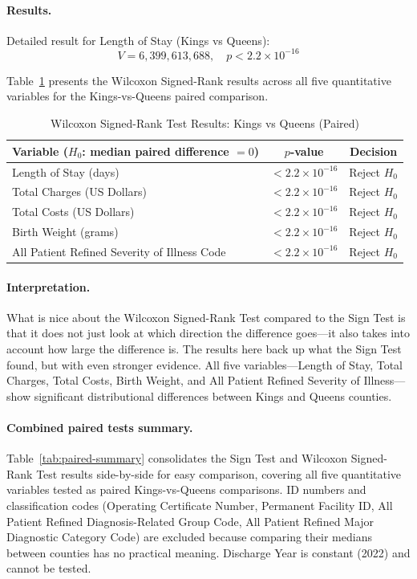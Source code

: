 \documentclass[12pt]{article}
\begin{document}
\paragraph{Results.}

Detailed result for Length of Stay (Kings vs Queens):
\[
V = 6{,}399{,}613{,}688, \quad p < 2.2 \times 10^{-16}
\]

Table~\ref{tab:wsr-all} presents the Wilcoxon Signed-Rank results
across all five quantitative variables for the Kings-vs-Queens paired
comparison.

\begin{table}[H]
\centering
\caption{Wilcoxon Signed-Rank Test Results: Kings vs Queens (Paired)}
\label{tab:wsr-all}
\begin{tabular}{lcc}
\toprule
\textbf{Variable ($H_0$: median paired difference $= 0$)} & \textbf{$p$-value} & \textbf{Decision} \\
\midrule
Length of Stay (days)           & $< 2.2 \times 10^{-16}$ & Reject $H_0$ \\
Total Charges (US Dollars)             & $< 2.2 \times 10^{-16}$ & Reject $H_0$ \\
Total Costs (US Dollars)               & $< 2.2 \times 10^{-16}$ & Reject $H_0$ \\
Birth Weight (grams)            & $< 2.2 \times 10^{-16}$ & Reject $H_0$ \\
All Patient Refined Severity of Illness Code    & $< 2.2 \times 10^{-16}$ & Reject $H_0$ \\
\bottomrule
\end{tabular}
\end{table}

\paragraph{Interpretation.}
What is nice about the Wilcoxon Signed-Rank Test compared to the Sign
Test is that it does not just look at which direction the difference
goes---it also takes into account how large the difference is. The
results here back up what the Sign Test found, but with even stronger
evidence. All five variables---Length of Stay, Total Charges, Total
Costs, Birth Weight, and All Patient Refined Severity of Illness---show significant
distributional differences between Kings and Queens counties.

\paragraph{Combined paired tests summary.}
Table~\ref{tab:paired-summary} consolidates the Sign Test and Wilcoxon
Signed-Rank Test results side-by-side for easy comparison, covering
all five quantitative variables tested as paired Kings-vs-Queens
comparisons. ID numbers and classification codes (Operating
Certificate Number, Permanent Facility ID, All Patient Refined Diagnosis-Related Group Code, All Patient Refined Major Diagnostic Category Code)
are excluded because comparing their medians between counties has no
practical meaning. Discharge Year is constant (2022) and cannot be
tested.
\end{document}
